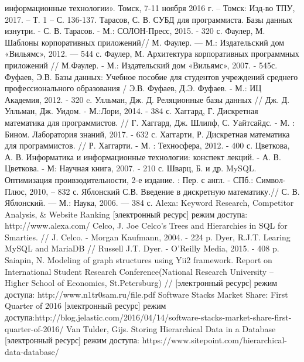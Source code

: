 \documentclass[a4paper,14pt]{extreport}
\theoremstyle{definition}
\begin{document}
\begin{thebibliography}{99}
информационные технологии». Томск, 7-11 ноября 2016 г. –  Томск: Изд-во ТПУ, 2017. – Т. 1 – С. 136-137.
 Тарасов, С. В. СУБД для программиста. Базы данных изнутри. - С. В. Тарасов. - М.: СОЛОН-Пресс, 2015. - 320 с.
 Фаулер, М. Шаблоны корпоративных приложений// М. Фаулер. — М.: Издательский дом «Вильямс», 2012. — 544 с.
 Фаулер, М. Архитектура корпоративных программных приложений // М.Фаулер. - М.: Издательский дом «Вильямс», 2007. - 545с.
 Фуфаев, Э.В. Базы данных: Учебное пособие для студентов учреждений среднего профессионального образования / Э.В. Фуфаев, Д.Э. Фуфаев. - М.: ИЦ Академия, 2012. - 320 c.
 Улльман, Дж. Д. Реляционные базы данных // Дж. Д. Улльман, Дж. Уидом. - М.:Лори, 2014. - 384 с.
 Хаггард, Г. Дискретная математика для программистов. // Г. Хаггард, Дж. Шлипф, С. Уайтсайдс. - М. : 	Бином. Лаборатория знаний, 2017. - 632 с.
 Хаггарти, Р. Дискретная математика для программистов. // Р. Хаггарти. - М. : Техносфера, 2012. - 400 с.
 Цветкова, А. В. Информатика и информационные технологии: конспект лекций. - А. В. Цветкова. - М: Научная книга, 2007. - 210 с.
 Шварц, Б. и др. MySQL. Оптимизация проивзодительности, 2-е издание. : Пер. с англ. - СПб.: Символ-Плюс, 2010, – 832 с.
 Яблонский С.В. Введение в дискретную математику.// С. В. Яблонский. — М.: Наука, 2006. — 384 с.
 Alexa: Keyword Research, Competitor Analysis, \& Website Ranking [электронный ресурс] режим доступа: http://www.alexa.com/
 Celco, J. Joe Celco's Trees and Hierarchies in SQL for Smarties. // J. Celco. - Morgan Kaufmann, 2004. - 224 p.
 Dyer, R.J.T. Learing MySQL and MariaDB // Russell J.T. Dyer. - O'Reilly Media, 2015. - 408 p.
 Saiapin, N. Modeling of graph structures using Yii2 framework. Report on International Student Research Conference(National Research University – Higher School of Economics, St.Petersburg) // [электронный ресурс] режим доступа: http://www.n1tr0sam.ru/file.pdf
 Software Stacks Market Share: First Quarter of 2016 [электронный ресурс] режим доступа:http://blog.jelastic.com/2016/04/14/software-stacks-market-share-first-quarter-of-2016/
 Van Tulder, Gijs. Storing Hierarchical Data in a Database [электронный ресурс] режим доступа: https://www.sitepoint.com/hierarchical-data-database/
\end{thebibliography}
\newpage
\appendix
{}
\end{document}
